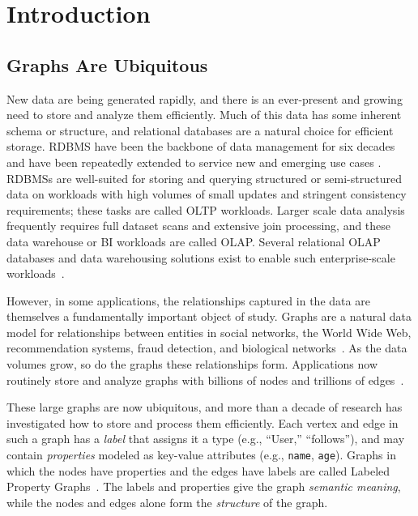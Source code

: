 \chapter{Introduction}
\label{sec:intro}

\section{Graphs Are Ubiquitous}
\label{sec:intro:ubiquitous}

New data are being generated rapidly, and there is an ever-present and growing need to store and analyze them efficiently.
Much of this data has some inherent schema or structure, and relational databases are a natural choice for efficient storage.
\ac{RDBMS} have been the backbone of data management for six decades and have been repeatedly extended to service new and emerging use cases \cite{stonebraker2018c,boncz2005monetdb, HStore2008Abadi, stonebraker2013voltdb,PASE2020:pgvector}.
RDBMSs are well-suited for storing and querying structured or semi-structured data on workloads with high volumes of small updates and stringent consistency requirements; these tasks are called \ac{OLTP} workloads.
Larger scale data analysis frequently requires full dataset scans and extensive join processing, and these data warehouse or \ac{BI} workloads are called \ac{OLAP}.
Several relational OLAP databases and data warehousing solutions exist to enable such enterprise-scale workloads~\cite{Redshift2015,boncz2005monetdb,vertica, raasveldt2019duckdb}.

However, in some applications, the relationships captured in the data are themselves a fundamentally important object of study. 
Graphs are a natural data model for relationships between entities in social networks, the World Wide Web, recommendation systems, fraud detection, and biological networks~\cite{ubiquityLargeGraphsVLDB2017}.
As the data volumes grow, so do the graphs these relationships form.
Applications now routinely store and analyze graphs with billions of nodes and trillions of edges~\cite{ching2015oneTrillion,besta2020demystifying, lin2018shentu, gupta2024graphscale, zhou2025redtao}.

These large graphs are now ubiquitous, and more than a decade of research has investigated how to store and process them efficiently.
Each vertex and edge in such a graph has a \emph{label} that assigns it a type (e.g., ``User,'' ``follows''), and may contain \emph{properties} modeled as key-value attributes (e.g., \texttt{name}, \texttt{age}).
Graphs in which the nodes have properties and the edges have labels are called Labeled Property Graphs~\cite{besta2020demystifying}.
The labels and properties give the graph \emph{semantic meaning}, while the nodes and edges alone form the \emph{structure} of the graph.

